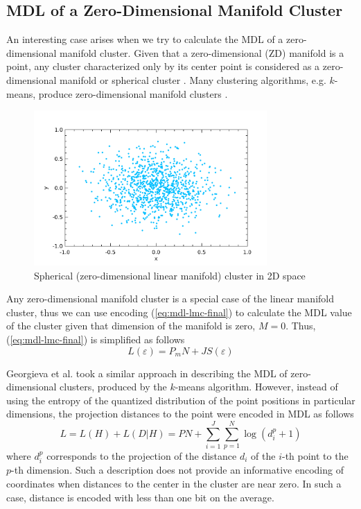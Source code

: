 \subsection{MDL of a Zero-Dimensional Manifold Cluster}
\label{ssc:zero-dim-mdl}




An interesting case arises when we try to calculate the MDL of
a zero-dimensional manifold cluster. Given that a zero-dimensional (ZD)
manifold is a point, any cluster characterized only by its center point is
considered as a zero-dimensional manifold or spherical cluster
.
Many clustering algorithms, e.g. $k$-means, produce zero-dimensional manifold
clusters \cite{Jain:1999mf}.

\ifIEEEtran
\else
\begin{figure}[ht]
\center
\includegraphics[width=3.5in]{img/zero-dim-mdl_zdc_1.pdf}
\caption{Spherical (zero-dimensional linear manifold) cluster in 2D space}
\label{fig:zdc}
\end{figure}


\fi

Any zero-dimensional manifold cluster is a special case of the linear manifold
cluster, thus we can use encoding (\ref{eq:mdl-lmc-final}) to calculate the MDL
value of the cluster given that dimension of the manifold is zero, $M = 0$.
Thus, (\ref{eq:mdl-lmc-final}) is simplified as follows
\begin{equation} \label{eq:mdl-zdm}
L(\varepsilon) = P_m N + J S(\varepsilon)
\end{equation}

Georgieva et al. \cite{Georgieva:2011tk} took a similar approach in
describing the MDL of zero-dimensional clusters, produced by the $k$-means
algorithm. However, instead of using the entropy of the quantized distribution
of the point positions in particular dimensions, the projection distances to
the point were encoded in MDL as follows
\begin{equation} \label{eq:mdl-zdc}
L = L(H) + L(D|H) = P N + \sum_{i=1}^{J} \sum_{p=1}^{N} \log (d_i^p + 1)
\end{equation}
where $d_i^p$ corresponds to the projection of the distance $d_i$ of
the $i$-th point to the $p$-th dimension.
Such a description does not provide an informative encoding of coordinates when
distances to the center in the cluster are near zero. In such a case, distance
is encoded with less than one bit on the average.


